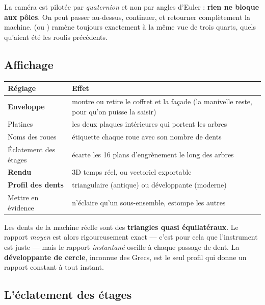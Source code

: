 \begin{astuce}
La caméra est pilotée par \emph{quaternion} et non par angles d'Euler : \textbf{rien ne bloque
aux pôles}. On peut passer au-dessus, continuer, et retourner complètement la machine.
 (ou ) ramène toujours exactement à la même vue de trois quarts,
quels qu'aient été les roulis précédents.
\end{astuce}

\subsection{Affichage}

\begin{center}
\begin{tabularx}{\textwidth}{@{}lX@{}}
\toprule
\rowcolor{lightblue}\textbf{Réglage} & \textbf{Effet} \\
\midrule
\textbf{Enveloppe} & montre ou retire le coffret et la façade (la manivelle reste, pour qu'on
puisse la saisir) \\
Platines & les deux plaques intérieures qui portent les arbres \\
Noms des roues & étiquette chaque roue avec son nombre de dents \\
Éclatement des étages & écarte les 16 plans d'engrènement le long des arbres \\
\textbf{Rendu} & 3D temps réel, ou vectoriel exportable \\
\textbf{Profil des dents} & triangulaire (antique) ou développante (moderne) \\
Mettre en évidence & n'éclaire qu'un sous-ensemble, estompe les autres \\
\bottomrule
\end{tabularx}
\end{center}

\begin{info}
Les dents de la machine réelle sont des \textbf{triangles quasi équilatéraux}. Le rapport
\emph{moyen} est alors rigoureusement exact — c'est pour cela que l'instrument est juste —
mais le rapport \emph{instantané} oscille à chaque passage de dent. La \textbf{développante de
cercle}, inconnue des Grecs, est le seul profil qui donne un rapport constant à tout instant.
\end{info}

\subsection{L'éclatement des étages}

